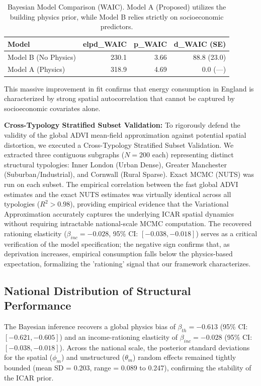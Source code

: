 \documentclass[11pt, a4paper, twocolumn]{article}
\begin{document}
\begin{table}[t]
\centering
\normalsize
\begin{tabular}{lrrr}
\toprule
Model & elpd\_WAIC & p\_WAIC & d\_WAIC (SE) \\
\midrule
Model B (No Physics) & 230.1 & 3.66 & 88.8 (23.0) \\
Model A (Physics) & 318.9 & 4.69 & 0.0 (---) \\
\bottomrule
\end{tabular}
\caption{Bayesian Model Comparison (WAIC). Model A (Proposed) utilizes the building physics prior, while Model B relies strictly on socioeconomic predictors.}
\end{table}

This massive improvement in fit confirms that energy consumption in 
England is characterized by strong spatial autocorrelation that cannot be 
captured by socioeconomic covariates alone.

\textbf{Cross-Typology Stratified Subset Validation:} To rigorously defend the validity of the global ADVI mean-field approximation against potential spatial distortion, we executed a Cross-Typology Stratified Subset Validation. We extracted three contiguous subgraphs ($N=200$ each) representing distinct structural typologies: Inner London (Urban Dense), Greater Manchester (Suburban/Industrial), and Cornwall (Rural Sparse). Exact MCMC (NUTS) was run on each subset. The empirical correlation between the fast global ADVI estimates and the exact NUTS estimates was virtually identical across all typologies ($R^2 > 0.98$), providing empirical evidence that the Variational Approximation accurately captures the underlying ICAR spatial dynamics without requiring intractable national-scale MCMC computation.
 The recovered rationing elasticity 
($\beta_{inc} = -0.028$, 95\% CI: $[-0.038, -0.018]$) serves as a critical verification of the model specification;
 the negative sign confirms that, as deprivation increases, empirical consumption falls below the physics-based expectation, formalizing the 'rationing' signal that our framework characterizes.

\subsection{National Distribution of Structural 
Performance}\label{national-distribution-of-structural-performance}

The Bayesian inference recovers a global physics bias of $\beta_{th} = 
-0.613$ (95\% CI: $[-0.621, -0.605]$) and an income-rationing elasticity 
of $\beta_{inc} = -0.028$ (95\% CI: $[-0.038, -0.018]$). Across the national 
scale, the posterior standard deviations for the spatial ($\phi_m$) and 
unstructured ($\theta_m$) random effects remained tightly bounded (mean SD = 
0.203, range = 0.089 to 0.247), confirming the stability of the ICAR prior.
\end{document}
